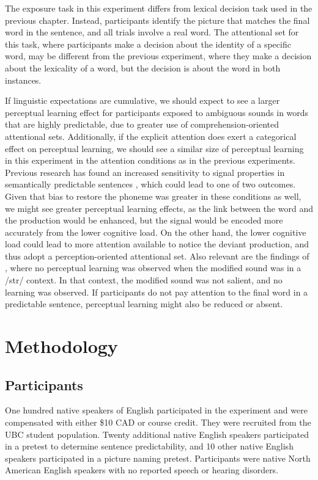 The exposure task in this experiment differs from lexical decision task used in the previous chapter.  
Instead, participants identify the picture that matches the final word in the sentence, and all trials involve a real word.
The attentional set for this task, where participants make a decision about the identity of a specific word, may be different from the previous experiment, where they make a decision about the lexicality of a word, but the decision is about the word in both instances.

If linguistic expectations are cumulative, we should expect to see a larger perceptual learning effect for participants exposed to ambiguous sounds in words that are highly predictable, due to greater use of comprehension-oriented attentional sets.
Additionally, if the explicit attention does exert a categorical effect on perceptual learning, we should see a similar size of perceptual learning in this experiment in the attention conditions as in the previous experiments.
Previous research has found an increased sensitivity to signal properties in semantically predictable sentences \citep{Samuel1981}, which could lead to one of two outcomes.
Given that bias to restore the phoneme was greater in these conditions as well, we might see greater perceptual learning effects, as the link between the word and the production would be enhanced, but the signal would be encoded more accurately from the lower cognitive load.
On the other hand, the lower cognitive load could lead to more attention available to notice the deviant production, and thus adopt a perception-oriented attentional set.
Also relevant are the findings of \citet{Kraljic2008a}, where no perceptual learning was observed when the modified sound was in a /str/ context.
In that context, the modified sound was not salient, and no learning was observed.
If participants do not pay attention to the final word in a predictable sentence, perceptual learning might also be reduced or absent.

\section{Methodology}

\subsection{Participants}

One hundred native speakers of English participated in the experiment and were compensated with either \$10 CAD or course credit. 
They were recruited from the UBC student population.  
Twenty additional native English speakers participated in a pretest to determine sentence predictability, and 10 other native English speakers participated in a picture naming pretest.
Participants were native North American English speakers with no reported speech or hearing disorders.

